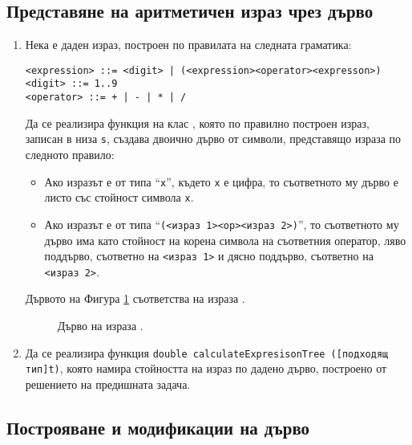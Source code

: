 \subsection {Представяне на аритметичен израз чрез дърво}
\begin{enumerate}[resume]
\item Нека е даден израз, построен по правилата на следната граматика:

\begin{verbatim}
<expression> ::= <digit> | (<expression><operator><expresson>)
<digit> ::= 1..9
<operator> ::= + | - | * | /
\end{verbatim}

Да се реализира функция на клас , която по правилно построен израз, записан в низа \texttt{s}, създава двоично дърво от символи, представящо израза по следното правило:
\begin{itemize}
  \item Ако изразът е от типа ``\texttt{x}'', където \texttt{x} е цифра, то съответното му дърво е листо със стойност символа \texttt{x}.
  \item Ако изразът е от типа ``\texttt{(<израз 1><op><израз 2>)}'', то съответното му дърво има като стойност на корена символа на съответния оператор, ляво поддърво, съответно на \texttt{<израз 1>} и дясно поддърво, съответно на \texttt{<израз 2>}.
\end{itemize}

Дървото на Фигура \ref{fig:treeexpr} съответства на израза .

\begin{figure}
\centering
{}
\caption{Дърво на израза .}
\label{fig:treeexpr}
\end{figure}

\item Да се реализира функция \texttt{double calculateExpresisonTree ([подходящ тип]t)}, която намира стойността на израз по дадено дърво, построено от решението на предишната задача.

\end{enumerate}

\subsection {Построяване и модификации на дърво}


